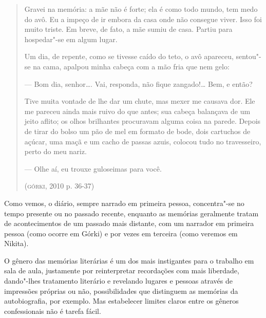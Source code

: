 \documentclass{article}
\begin{document}
\begin{quote}
Gravei na memória: a mãe não é forte; ela é como todo mundo, tem medo do
avô. Eu a impeço de ir embora da casa onde não consegue viver. Isso foi
muito triste. Em breve, de fato, a mãe sumiu de casa. Partiu para
hospedar"-se em algum lugar.

Um dia, de repente, como se tivesse caído do teto, o avô apareceu,
sentou"-se na cama, apalpou minha cabeça com a mão fria que nem gelo:

--- Bom dia, senhor\ldots{}. Vai, responda, não fique zangado!\ldots{} Bem, e
então?

Tive muita vontade de lhe dar um chute, mas mexer me causava dor. Ele me
pareceu ainda mais ruivo do que antes; sua cabeça balançava de um jeito
aflito; os olhos brilhantes procuravam alguma coisa na parede. Depois de
tirar do bolso um pão de mel em formato de bode, dois cartuchos de
açúcar, uma maçã e um cacho de passas azuis, colocou tudo no
travesseiro, perto do meu nariz.

--- Olhe aí, eu trouxe guloseimas para você.

(\textsc{górki}, 2010 p. 36-37)
\end{quote}


Como vemos, o diário, sempre narrado em primeira pessoa, concentra"-se no
tempo presente ou no passado recente, enquanto as memórias geralmente
tratam de acontecimentos de um passado mais distante, com um narrador em
primeira pessoa (como ocorre em Górki) e por vezes em terceira (como
veremos em Nikita).

O gênero das memórias literárias é um dos mais instigantes para o
trabalho em sala de aula, justamente por reinterpretar recordações com
mais liberdade, dando"-lhes tratamento literário e revelando lugares e
pessoas através de impressões próprias ou não, possibilidades que
distinguem as memórias da autobiografia, por exemplo. Mas estabelecer
limites claros entre os gêneros confessionais não é tarefa fácil.
\end{document}
